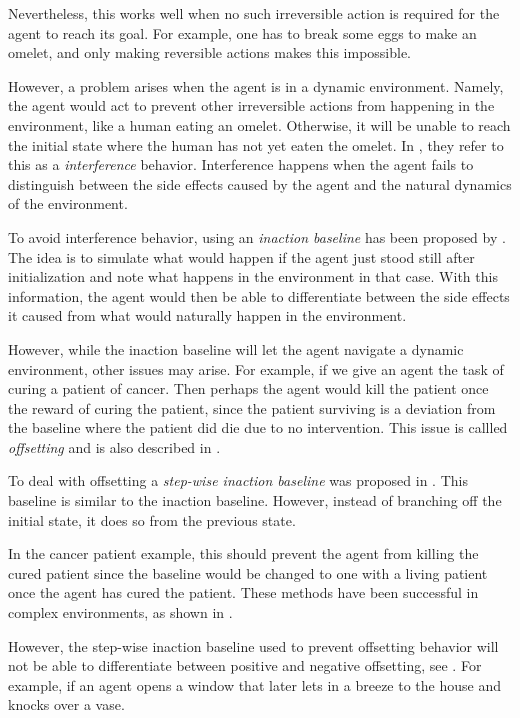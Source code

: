 \documentclass[12pt,A4]{report}
\theoremstyle{definition}
\begin{document}
Nevertheless, this works well when no such irreversible action is required for the agent to reach its goal. For example, one has to break some eggs to make an omelet, and only making reversible actions makes this impossible. 

However, a problem arises when the agent is in a dynamic environment. Namely, the agent would act to prevent other irreversible actions from happening in the environment, like a human eating an omelet. Otherwise, it will be unable to reach the initial state where the human has not yet eaten the omelet. In \citet{Krakovna19}, they refer to this as a \textit{interference} behavior. Interference happens when the agent fails to distinguish between the side effects caused by the agent and the natural dynamics of the environment. 

To avoid interference behavior, using an \textit{inaction baseline} has been proposed by \citet{Krakovna19}. The idea is to simulate what would happen if the agent just stood still after initialization and note what happens in the environment in that case. With this information, the agent would then be able to differentiate between the side effects it caused from what would naturally happen in the environment. 

However, while the inaction baseline will let the agent navigate a dynamic environment, other issues may arise. For example, if we give an agent the task of curing a patient of cancer. Then perhaps the agent would kill the patient once the reward of curing the patient, since the patient surviving is a deviation from the baseline where the patient did die due to no intervention. This issue is callled \textit{offsetting} and is also described in \citet{Krakovna19}.

To deal with offsetting a \textit{step-wise inaction baseline} was proposed in \citet{Krakovna19}. This baseline is similar to the inaction baseline. However, instead of branching off the initial state, it does so from the previous state.

In the cancer patient example, this should prevent the agent from killing the cured patient since the baseline would be changed to one with a living patient once the agent has cured the patient. These methods have been successful in complex environments, as shown in \citet{Turner20}. 

However, the step-wise inaction baseline used to prevent offsetting behavior will not be able to differentiate between positive and negative offsetting, see \citet{Krakovna20}. For example, if an agent opens a window that later lets in a breeze to the house and knocks over a vase. 
\end{document}
